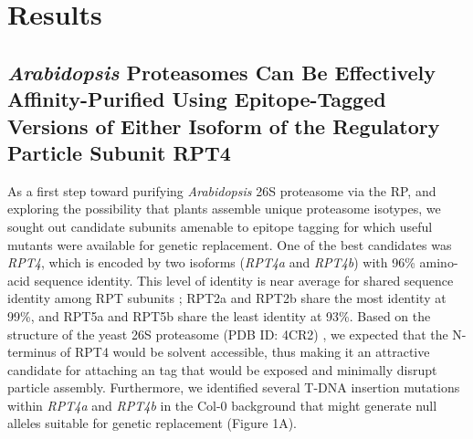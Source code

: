 \section{Results}
\subsection{\textit{Arabidopsis} Proteasomes Can Be Effectively Affinity-Purified Using Epitope-Tagged Versions of Either Isoform of the Regulatory Particle Subunit RPT4}
As a first step toward purifying \textit{Arabidopsis} 26S proteasome via the RP, and exploring the possibility that plants assemble unique proteasome isotypes, we sought out candidate subunits amenable to epitope tagging for which useful mutants were available for genetic replacement.  One of the best candidates was \textit{RPT4}, which is encoded by two isoforms (\textit{RPT4a} and \textit{RPT4b}) with 96\% amino-acid sequence identity.  This level of identity is near average for shared sequence identity among RPT subunits \citep{book10}; RPT2a and RPT2b share the most identity at 99\%, and RPT5a and RPT5b share the least identity at 93\%. Based on the structure of the yeast 26S proteasome (PDB ID: 4CR2) \citep{beck12}, we expected that the N-terminus of RPT4 would be solvent accessible, thus making it an attractive candidate for attaching an tag that would be exposed and minimally disrupt particle assembly.  Furthermore, we identified several T-DNA insertion mutations within \textit{RPT4a} and \textit{RPT4b} in the Col-0 background that might generate null alleles suitable for genetic replacement (Figure 1A).   
